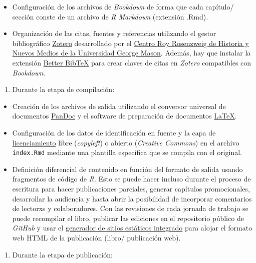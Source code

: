 \documentclass[
]{book}
\providecommand{\tightlist}{%
  \setlength{\itemsep}{0pt}\setlength{\parskip}{0pt}}
\begin{document}
\begin{itemize}
\item
  Configuración de los archivos de \emph{Bookdown} de forma que cada capítulo/ sección conste de un archivo de \emph{R Markdown} (extensión .Rmd).
\item
  Organización de las citas, fuentes y referencias utilizando el gestor bibliográfico \href{https://zotero.org/}{Zotero} desarrollado por el \href{https://rrchnm.org/}{Centro Roy Rosenzweig de Historia y Nuevos Medios de la Universidad George Mason}. Además, hay que instalar la extensión \href{https://github.com/retorquere/zotero-better-bibtex}{Better BibTeX} para crear claves de citas en \emph{Zotero} compatibles con \emph{Bookdown}.
\end{itemize}

\begin{enumerate}
\def\labelenumi{\arabic{enumi}.}
\setcounter{enumi}{1}
\tightlist
\item
  Durante la etapa de compilación:
\end{enumerate}

\begin{itemize}
\item
  Creación de los archivos de salida utilizando el conversor universal de documentos \href{https://pandoc.org/}{PanDoc} y el software de preparación de documentos \href{https://www.latex-project.org/}{LaTeX}.
\item
  Configuración de los datos de identificación en fuente y la capa de \protect\hyperlink{licencias}{licenciamiento} libre (\emph{copyleft}) o abierto (\emph{Creative Commons}) en el archivo \texttt{index.Rmd} mediante una plantilla específica que se compila con el original.
\item
  Definición diferencial de contenido en función del formato de salida usando fragmentos de código de \emph{R}. Esto se puede hacer incluso durante el proceso de escritura para hacer publicaciones parciales, generar capítulos promocionales, desarrollar la audiencia y hasta abrir la posibilidad de incorporar comentarios de lectorxs y colaboradores. Con las revisiones de cada jornada de trabajo se puede recompilar el libro, publicar las ediciones en el repositorio público de \emph{GitHub} y usar el \href{https://pages.github.com/}{generador de sitios estáticos integrado} para alojar el formato web HTML de la publicación (libro/ publicación web).
\end{itemize}

\begin{enumerate}
\def\labelenumi{\arabic{enumi}.}
\setcounter{enumi}{2}
\tightlist
\item
  Durante la etapa de publicación:
\end{enumerate}
\end{document}
